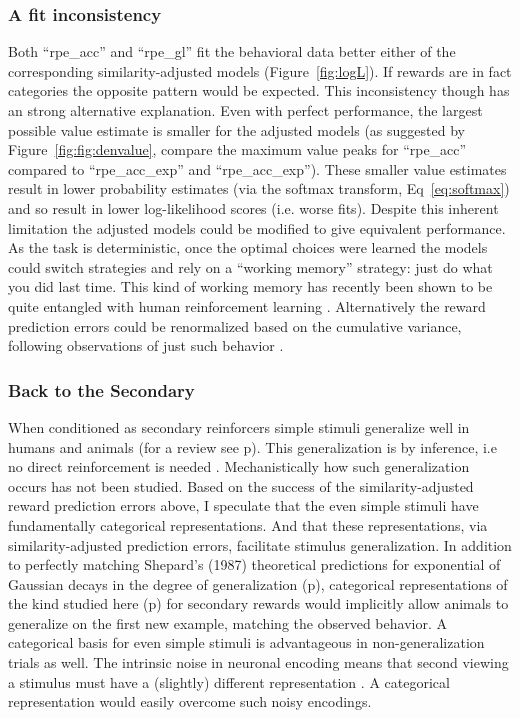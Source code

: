 \documentclass[doc,12pt]{apa}        %
\begin{document}
\subsubsection{A fit inconsistency}
\label{subsub:inconsistency}
Both ``rpe\_acc'' and ``rpe\_gl'' fit the behavioral data better either of the corresponding similarity-adjusted models (Figure~\ref{fig:logL}).  If rewards are in fact categories the opposite pattern would be expected.  This inconsistency though has an strong alternative explanation.  Even with perfect performance, the largest possible value estimate is smaller for the adjusted models (as suggested by Figure~\ref{fig:fig:denvalue}, compare the maximum value peaks for ``rpe\_acc'' compared to ``rpe\_acc\_exp'' and ``rpe\_acc\_exp'').  These smaller value estimates result in lower probability estimates (via the softmax transform, Eq~\ref{eq:softmax}) and so result in lower log-likelihood scores (i.e. worse fits).  Despite this inherent limitation the adjusted models could be modified to give equivalent performance.  As the task is deterministic, once the optimal choices were learned the models could switch strategies and rely on a ``working memory'' strategy: just do what you did last time.  This kind of working memory has recently been shown to be quite entangled with human reinforcement learning \cite{Collins:2012p9779}.  Alternatively the reward prediction errors could be renormalized based on the cumulative variance, following observations of just such behavior \cite{Tobler:2005p6373}.


\subsubsection{Back to the Secondary}
\label{sub:generalsense}
When conditioned as secondary reinforcers simple stimuli generalize well in humans and animals (for a review see p\pageref{subsub:birds}).  This generalization is by inference, i.e no direct reinforcement is needed \cite{Guttman:1956p8355,Nakamura:2006p9093,Smith:2011p9101}.  Mechanistically how such generalization occurs has not been studied.  Based on the success of the similarity-adjusted reward prediction errors above, I speculate that the even simple stimuli have fundamentally categorical representations.  And that these representations, via similarity-adjusted prediction errors, facilitate stimulus generalization.  In addition to perfectly matching Shepard's (1987) theoretical predictions for exponential of Gaussian decays in the degree of generalization (p\pageref{subsub:curves}), categorical representations of the kind studied here (p\pageref{subsub:catquant}) for secondary rewards would implicitly allow animals to generalize on the first new example, matching the observed behavior.  A categorical basis for even simple stimuli is advantageous in non-generalization trials as well. The intrinsic noise in neuronal encoding means that second viewing a stimulus must have a (slightly) different representation \cite{Ashby:1986p9783}.  A categorical representation would easily overcome such noisy encodings. 
\end{document}
